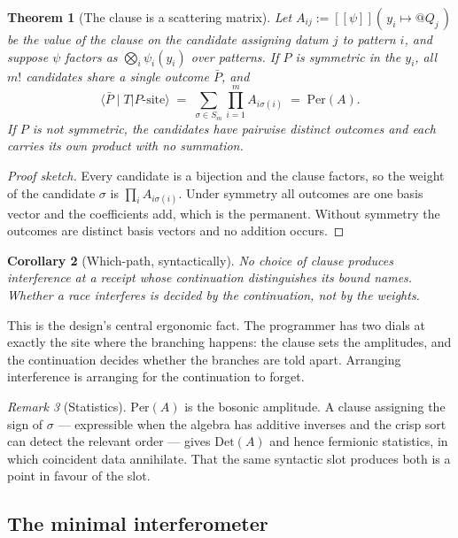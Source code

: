 \documentclass[11pt,a4paper]{article}
\theoremstyle{plain}
\newtheorem{theorem}{Theorem}[section]
\newtheorem{corollary}[theorem]{Corollary}
\theoremstyle{definition}
\theoremstyle{remark}
\newtheorem{remark}[theorem]{Remark}
\newcommand{\sem}[1]{[\![#1]\!]}
\newcommand{\Per}{\mathrm{Per}}
\newcommand{\Det}{\mathrm{Det}}
\begin{document}
\begin{theorem}[The clause is a scattering matrix]\label{thm:scattering}
Let $A_{ij} := \sem{\psi}(\,y_i \mapsto @Q_j\,)$ be the value of the clause on the
candidate assigning datum $j$ to pattern $i$, and suppose $\psi$ factors as
$\bigotimes_i \psi_i(y_i)$ over patterns. If $P$ is symmetric in the $y_i$, all
$m!$ candidates share a single outcome $\bar{P}$, and
\[
  \langle \bar{P} \mid T \lvert P\text{-site}\rangle
  \;=\; \sum_{\sigma \in S_m} \prod_{i=1}^{m} A_{i\sigma(i)}
  \;=\; \Per(A).
\]
If $P$ is not symmetric, the candidates have pairwise distinct outcomes and each
carries its own product with no summation.
\end{theorem}

\begin{proof}[Proof sketch]
Every candidate is a bijection and the clause factors, so the weight of the
candidate $\sigma$ is $\prod_i A_{i\sigma(i)}$. Under symmetry all outcomes are
one basis vector and the coefficients add, which is the permanent. Without
symmetry the outcomes are distinct basis vectors and no addition occurs.
\end{proof}

\begin{corollary}[Which-path, syntactically]\label{cor:whichpath}
No choice of clause produces interference at a receipt whose continuation
distinguishes its bound names. Whether a race interferes is decided by the
continuation, not by the weights.
\end{corollary}

This is the design's central ergonomic fact. The programmer has two dials at
exactly the site where the branching happens: the clause sets the amplitudes, and
the continuation decides whether the branches are told apart. Arranging
interference is arranging for the continuation to forget.

\begin{remark}[Statistics]\label{rem:stats}
$\Per(A)$ is the bosonic amplitude. A clause assigning the sign of $\sigma$ ---
expressible when the algebra has additive inverses and the crisp sort can
detect the relevant order --- gives $\Det(A)$ and hence fermionic statistics, in
which coincident data annihilate. That the same syntactic slot produces both is a
point in favour of the slot.
\end{remark}

\subsection{The minimal interferometer}\label{ssec:interferometer}
\end{document}
